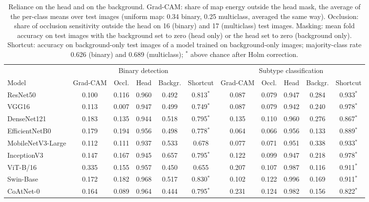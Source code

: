 \documentclass[final,3p,times,number]{elsarticle}
\begin{document}
\begin{table}[htbp]
\centering
\caption{Reliance on the head and on the background. Grad-CAM: share of map energy outside the head mask, the average of the per-class means over test images (uniform map: 0.34 binary, 0.25 multiclass, averaged the same way). Occlusion: share of occlusion sensitivity outside the head on 16 (binary) and 17 (multiclass) test images. Masking: mean fold accuracy on test images with the background set to zero (head only) or the head set to zero (background only). Shortcut: accuracy on background-only test images of a model trained on background-only images; majority-class rate 0.626 (binary) and 0.689 (multiclass); $^{*}$ above chance after Holm correction.}
\label{tab:attention}
\small
\setlength{\tabcolsep}{3pt}
\begin{tabular*}{\textwidth}{@{\extracolsep{\fill}}lcccccccccc@{}}
\toprule
 & \multicolumn{5}{c}{Binary detection} & \multicolumn{5}{c}{Subtype classification} \\
\cmidrule(lr){2-6}\cmidrule(l){7-11}
Model & Grad-CAM & Occl. & Head & Backgr. & Shortcut & Grad-CAM & Occl. & Head & Backgr. & Shortcut \\
\midrule
ResNet50 & 0.100 & 0.116 & 0.960 & 0.492 & 0.813$^{*}$ & 0.087 & 0.079 & 0.947 & 0.284 & 0.933$^{*}$ \\
VGG16 & 0.113 & 0.007 & 0.947 & 0.499 & 0.749$^{*}$ & 0.087 & 0.079 & 0.942 & 0.240 & 0.978$^{*}$ \\
DenseNet121 & 0.183 & 0.135 & 0.944 & 0.518 & 0.795$^{*}$ & 0.135 & 0.110 & 0.960 & 0.276 & 0.867$^{*}$ \\
EfficientNetB0 & 0.179 & 0.194 & 0.956 & 0.498 & 0.778$^{*}$ & 0.064 & 0.066 & 0.956 & 0.133 & 0.889$^{*}$ \\
MobileNetV3-Large & 0.112 & 0.111 & 0.937 & 0.533 & 0.678 & 0.077 & 0.071 & 0.951 & 0.338 & 0.933$^{*}$ \\
InceptionV3 & 0.147 & 0.167 & 0.945 & 0.657 & 0.795$^{*}$ & 0.122 & 0.099 & 0.947 & 0.218 & 0.978$^{*}$ \\
ViT-B/16 & 0.335 & 0.155 & 0.957 & 0.450 & 0.655 & 0.207 & 0.107 & 0.987 & 0.116 & 0.911$^{*}$ \\
Swin-Base & 0.172 & 0.182 & 0.968 & 0.517 & 0.830$^{*}$ & 0.102 & 0.122 & 0.996 & 0.169 & 0.911$^{*}$ \\
CoAtNet-0 & 0.164 & 0.089 & 0.964 & 0.444 & 0.795$^{*}$ & 0.231 & 0.124 & 0.982 & 0.156 & 0.822$^{*}$ \\
\bottomrule
\end{tabular*}
\end{table}
\end{document}
